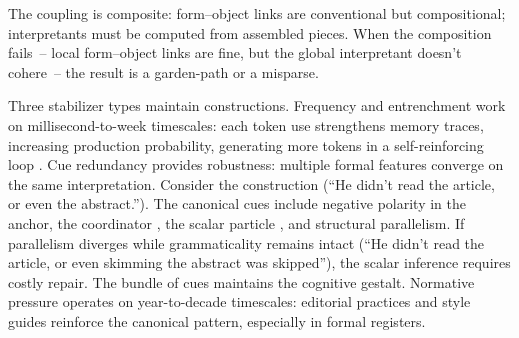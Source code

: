 The coupling is composite: form--object links are conventional but compositional; interpretants must be computed from assembled pieces. When the composition fails~-- local form--object links are fine, but the global interpretant doesn't cohere~-- the result is a garden-path or a misparse.

Three stabilizer types maintain constructions. Frequency and entrenchment work on millisecond-to-week timescales: each token use strengthens memory traces, increasing production probability, generating more tokens in a self-reinforcing loop \parencite{bybee2001}. Cue redundancy provides robustness: multiple formal features converge on the same interpretation. Consider the  construction (\enquote{He didn't read the article, or even the abstract.}). The canonical cues include negative polarity in the anchor, the coordinator , the scalar particle , and structural parallelism. If parallelism diverges while grammaticality remains intact (\enquote{He didn't read the article, or even skimming the abstract was skipped}), the scalar inference requires costly repair. The bundle of cues maintains the cognitive gestalt. Normative pressure operates on year-to-decade timescales: editorial practices and style guides reinforce the canonical pattern, especially in formal registers.

